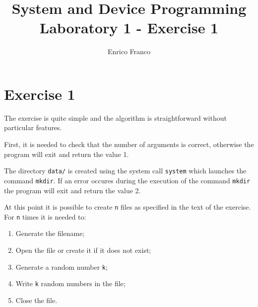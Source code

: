 \documentclass{report}
\author{Enrico Franco}
\title{System and Device Programming \\
	Laboratory 1 - Exercise 1}
\begin{document}
\section*{Exercise 1}
The exercise is quite simple and the algorithm is straightforward without particular features.

First, it is needed to check that the number of arguments is correct, otherwise the program will exit and return the value 1.

The directory \texttt{data/} is created using the system call \texttt{system} which launches the command \texttt{mkdir}. If an error occures during the execution of the command \texttt{mkdir} the program will exit and return the value 2.

At this point it is possible to create \texttt{n} files as specified in the text of the exercise.
For \texttt{n} times it is needed to:
\begin{enumerate}
\item Generate the filename;
\item Open the file or create it if it does not exist;
\item Generate a random number \texttt{k};
\item Write \texttt{k} random numbers in the file;
\item Close the file.
\end{enumerate}
\end{document}
